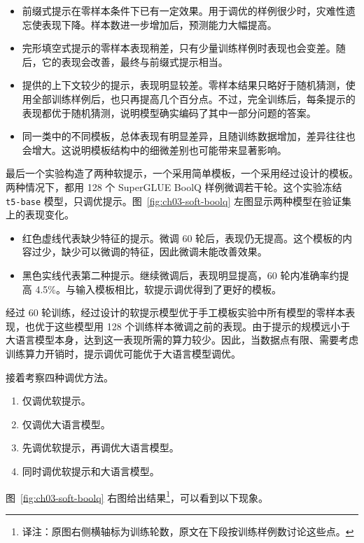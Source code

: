 \begin{itemize}
\item 前缀式提示在零样本条件下已有一定效果。用于调优的样例很少时，灾难性遗忘使表现下降。样本数进一步增加后，预测能力大幅提高。
\item 完形填空式提示的零样本表现稍差，只有少量训练样例时表现也会变差。随后，它的表现会改善，最终与前缀式提示相当。
\item 提供的上下文较少的提示，表现明显较差。零样本结果只略好于随机猜测，使用全部训练样例后，也只再提高几个百分点。不过，完全训练后，每条提示的表现都优于随机猜测，说明模型确实编码了其中一部分问题的答案。
\item 同一类中的不同模板，总体表现有明显差异，且随训练数据增加，差异往往也会增大。这说明模板结构中的细微差别也可能带来显著影响。
\end{itemize}

最后一个实验构造了两种软提示，一个采用简单模板，一个采用经过设计的模板。两种情况下，都用 128 个 SuperGLUE BoolQ 样例微调若干轮。这个实验冻结 \texttt{t5-base} 模型，只调优提示。图~\ref{fig:ch03-soft-boolq} 左图显示两种模型在验证集上的表现变化。

\begin{itemize}
\item 红色虚线代表缺少特征的提示。微调 60 轮后，表现仍无提高。这个模板的内容过少，缺少可以微调的特征，因此微调未能改善效果。
\item 黑色实线代表第二种提示。继续微调后，表现明显提高，60 轮内准确率约提高 4.5\%。与输入模板相比，软提示调优得到了更好的模板。
\end{itemize}

经过 60 轮训练，经过设计的软提示模型优于手工模板实验中所有模型的零样本表现，也优于这些模型用 128 个训练样本微调之前的表现。由于提示的规模远小于大语言模型本身，达到这一表现所需的算力较少。因此，当数据点有限、需要考虑训练算力开销时，提示调优可能优于大语言模型调优。

接着考察四种调优方法。

\begin{enumerate}
\item 仅调优软提示。
\item 仅调优大语言模型。
\item 先调优软提示，再调优大语言模型。
\item 同时调优软提示和大语言模型。
\end{enumerate}

图~\ref{fig:ch03-soft-boolq} 右图给出结果\footnote{译注：原图右侧横轴标为训练轮数，原文在下段按训练样例数讨论这些点。}，可以看到以下现象。

